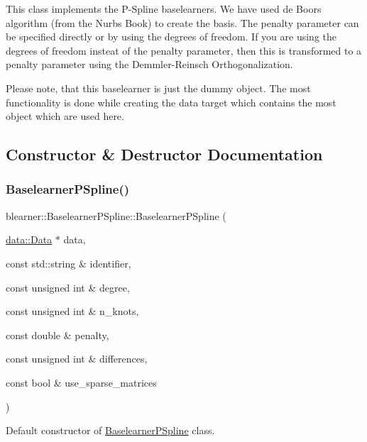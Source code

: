 This class implements the P-\/\+Spline baselearners. We have used de Boors algorithm (from the Nurbs Book) to create the basis. The penalty parameter can be specified directly or by using the degrees of freedom. If you are using the degrees of freedom insteat of the penalty parameter, then this is transformed to a penalty parameter using the Demmler-\/\+Reinsch Orthogonalization.

Please note, that this baselearner is just the dummy object. The most functionality is done while creating the data target which contains the most object which are used here. 

\subsection{Constructor \& Destructor Documentation}
\mbox{\label{classblearner_1_1_baselearner_p_spline_af891e692907a085213491c584305fbde}} 
\subsubsection{\texorpdfstring{Baselearner\+P\+Spline()}{BaselearnerPSpline()}}
{\footnotesize\ttfamily blearner\+::\+Baselearner\+P\+Spline\+::\+Baselearner\+P\+Spline (\begin{DoxyParamCaption}\item[{\hyperlink{classdata_1_1_data}{data\+::\+Data} $\ast$}]{data,  }\item[{const std\+::string \&}]{identifier,  }\item[{const unsigned int \&}]{degree,  }\item[{const unsigned int \&}]{n\+\_\+knots,  }\item[{const double \&}]{penalty,  }\item[{const unsigned int \&}]{differences,  }\item[{const bool \&}]{use\+\_\+sparse\+\_\+matrices }\end{DoxyParamCaption})}



Default constructor of {\ttfamily \hyperlink{classblearner_1_1_baselearner_p_spline}{Baselearner\+P\+Spline}} class. 

